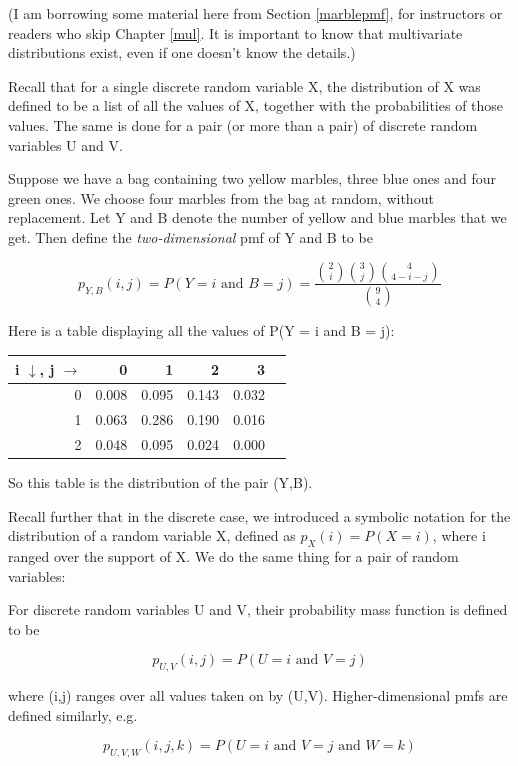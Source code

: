 (I am borrowing some material here from Section \ref{marblepmf}, for
instructors or readers who skip Chapter \ref{mul}.  It is important to
know that multivariate distributions exist, even if one doesn't know the
details.)

Recall that for a single discrete random variable X, the distribution of
X was defined to be a list of all the values of X, together with the
probabilities of those values.  The same is done for a pair (or more
than a pair) of discrete random variables U and V.

Suppose we have a bag containing two yellow marbles, three blue ones and
four green ones.  We choose four marbles from the bag at random,
without replacement.  Let Y and B denote the number of yellow and blue
marbles that we get.  Then define the {\it two-dimensional} pmf of Y and
B to be

\begin{equation}
p_{Y,B}(i,j) = P(Y = i \textrm{ and } B = j) = 
\frac
{
\binom{2}{i}
\binom{3}{j}
\binom{4}{4-i-j}
}
{\binom{9}{4}}
\end{equation}

Here is a table displaying all the values of P(Y = i and B = j):

\begin{tabular}{|r|r|r|r|r|r|}
\hline
i $\downarrow$, j $\rightarrow$ & 0 & 1 & 2 & 3 \\ \hline
0 & 0.008 & 0.095 & 0.143 & 0.032 \\ \hline
1 & 0.063 & 0.286 & 0.190 & 0.016 \\ \hline
2 & 0.048 & 0.095 & 0.024 & 0.000 \\ \hline
\end{tabular}

So this table is the distribution of the pair (Y,B).

Recall further that in the discrete case, we introduced a symbolic
notation for the distribution of a random variable X, defined as
$p_X(i) = P(X = i)$, where i ranged over the support of X.
We do the same thing for a pair of random variables:

\begin{definition}
For discrete random variables U and V, their
probability mass function is defined to be

\begin{equation}
p_{U,V}(i,j) = P(U = i \textrm{ and } V = j)
\end{equation}

where (i,j) ranges over all values taken on by (U,V).
Higher-dimensional pmfs are defined similarly, e.g.

\begin{equation}
p_{U,V,W}(i,j,k) = P(U = i \textrm{ and } V = j \textrm{ and } W = k)
\end{equation}
\end{definition}

